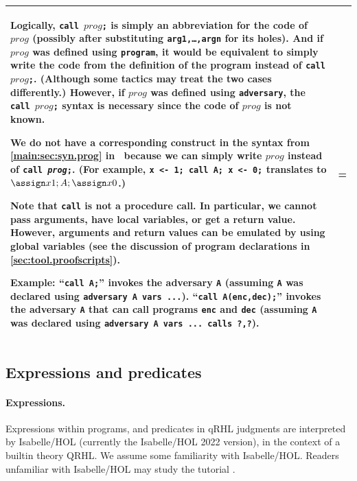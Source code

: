 \documentclass{article}
\newcommand\qrhlautoref[1]{\autoref*{main:#1} in~\cite{qrhl-paper-from-manual}}
\begin{document}
\begin{longtable}{|p{.275\hsize}|>{\parskip=\medskipamount}p{.66\hsize}|}
  Logically, \texttt{call $\mathit{prog}$;}
  is simply an abbreviation for the code of $\mathit{prog}$
  (possibly after substituting \texttt{arg1,\dots,argn} for its holes).
  And if $\mathit{prog}$
  was defined using \texttt{program}, it would be equivalent to simply
  write the code from the definition of the program instead of
  \texttt{call $\mathit{prog}$;}.
  (Although some tactics may treat the two cases differently.)
  However, if $\mathit{prog}$
  was defined using \texttt{adversary}, the \texttt{call
    $\mathit{prog}$;}
  syntax is necessary since the code of $\mathit{prog}$ is not known.

  We do not have a corresponding construct in the syntax from
  \qrhlautoref{sec:syn.prog} because we can simply write $\mathit{prog}$
  instead of \texttt{call \textit{prog};}. (For example, \texttt{x <-
    1; call A; x <- 0;} translates to $\assign x1;A;\assign x0$.)

  Note that \texttt{call} is not a procedure call. In particular, we
  cannot pass arguments, have local variables, or get a return
  value. However, arguments and return values can be emulated
  by using global variables (see the discussion of program
  declarations in \autoref{sec:tool.proofscripts}).

  \textbf{Example:} ``\texttt{call A;}'' invokes the adversary \texttt{A}
  (assuming \texttt{A} was declared using \texttt{adversary A vars
    ...}).  ``\texttt{call A(enc,dec);}'' invokes the adversary \texttt{A}
  that can call programs \texttt{enc} and \texttt{dec}
  (assuming \texttt{A} was declared using \texttt{adversary A vars
    ... calls ?,?}).
  \\
  \hline
\end{longtable}

\subsection{Expressions and predicates}
\label{sec:tool.pred}

\newcommand\tooltype[1]{\index{#1@\textttOLD{#1} (Isabelle/HOL type)}}

\paragraph{Expressions.}
Expressions within programs, and predicates in qRHL judgments are
interpreted by Isabelle/HOL (currently the Isabelle/HOL 2022 version), in the
context of a builtin theory QRHL. We assume some familiarity with
Isabelle/HOL. Readers unfamiliar with Isabelle/HOL may study the
tutorial \cite{isabelle-tutorial}.
\end{document}
